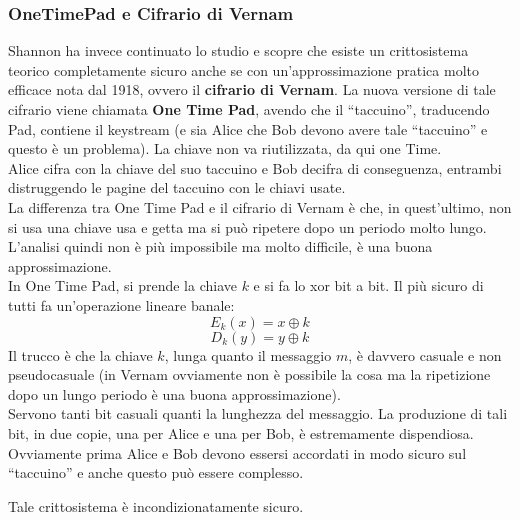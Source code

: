 \documentclass[a4paper,12pt, oneside]{book}
\begin{document}
\subsubsection{OneTimePad e Cifrario di Vernam}
Shannon ha invece continuato lo studio e scopre che esiste un crittosistema
teorico completamente sicuro anche se con un'approssimazione pratica molto
efficace nota dal 1918, ovvero il \textbf{cifrario di Vernam}. La nuova versione
di tale cifrario viene chiamata \textbf{One Time Pad}, avendo che il
``taccuino'', traducendo Pad, contiene il keystream (e sia Alice che Bob devono
avere tale ``taccuino'' e questo è un problema). La chiave non va riutilizzata,
da qui one Time.\\
Alice cifra con la chiave del suo taccuino e Bob decifra di conseguenza,
entrambi distruggendo le pagine del taccuino con le chiavi usate.\\
La differenza tra One Time Pad e il cifrario di Vernam è che, in quest'ultimo,
non si usa una chiave usa e getta ma si può ripetere dopo un periodo molto
lungo. L'analisi quindi non è più impossibile ma molto difficile, è una buona
approssimazione. \\
In One Time Pad, si prende la chiave $k$ e si fa lo xor bit a bit. Il più sicuro
di tutti fa un'operazione lineare banale:
\[E_k(x)=x\oplus k\]
\[D_k(y)=y\oplus k\]
Il trucco è che la chiave $k$, lunga quanto il messaggio $m$, è davvero casuale
e non pseudocasuale (in Vernam 
ovviamente non è possibile la cosa ma la ripetizione dopo un lungo periodo è una
buona approssimazione). \\
Servono tanti bit casuali quanti la lunghezza del messaggio. La produzione di
tali bit, in due copie, una per Alice e una per Bob, è estremamente
dispendiosa.\\
Ovviamente prima Alice e Bob devono essersi accordati in modo sicuro sul
``taccuino'' e anche questo può essere complesso. 
\begin{teorema}
  Tale crittosistema è incondizionatamente sicuro.
\end{teorema}
\end{document}
